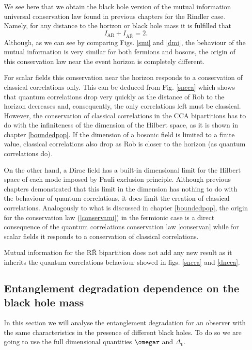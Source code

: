 We see here that we obtain the black hole version of the mutual
information universal conservation law found in previous chapters for the
Rindler case. Namely, for any distance to the horizon or
black hole mass it is fulfilled that
\begin{equation}\label{conservami}
I_\text{AR}+I_{\text{A}\bar{\text{R}}}=2.
\end{equation}
Although, as we can see by comparing Figs. \ref{smi} and  \ref{dmi}, the
behaviour of the mutual information is very similar for both fermions and
bosons, the origin of this conservation law near the event horizon is
completely different.

For scalar fields this conservation near the horizon responds to a
conservation of  classical correlations only. This can be deduced from Fig.
\ref{sncca} which shows that quantum correlations drop very quickly as
the distance of Rob to the horizon decreases and, consequently, the only
correlations left  must be classical. However, the conservation of
classical correlations in the CCA bipartitions has to do with the
infiniteness of the dimension of the Hilbert space, as it is shown in
chapter \ref{boundedpop}. If the dimension of a bosonic field is limited to a finite value,
classical correlations also drop  as Rob is closer to the horizon (as
quantum correlations do).

On the other hand, a Dirac field has a built-in dimensional limit for the
Hilbert space of each mode imposed by Pauli exclusion principle. Although
previous chapters demonstrated that this limit in the dimension has nothing
to do with the behaviour of quantum correlations, it
does limit the creation of classical correlations. Analogously to what is
discussed in chapter \ref{boundedpop}, the origin for the conservation law
(\ref{conservami}) in the fermionic case is a direct consequence of the
quantum correlations conservation law \eqref{conservan} while for scalar fields it responds to a conservation of
classical correlations.

Mutual information for the $\text{R}\bar{\text{R}}$ bipartition does
not add any new result as it inherits the quantum correlations behaviour
showed in figs. \ref{sncca} and \ref{dncca}.

\subsection{Entanglement degradation dependence on the black hole mass}

In this section we will analyse the entanglement degradation for an
observer with the same characteristics in the presence of  different
black holes. To do so we are going to use the full dimensional quantities
$\omegar$ and $\Delta_0$.

